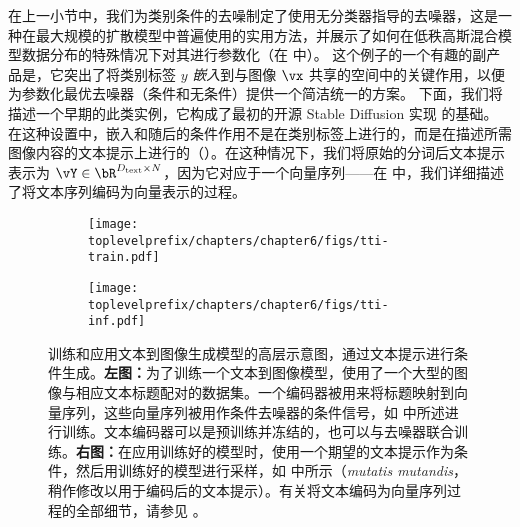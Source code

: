 \documentclass[../../book-main.tex]{subfiles}
\begin{document}
在上一小节中，我们为类别条件的去噪制定了使用无分类器指导的去噪器，这是一种在最大规模的扩散模型中普遍使用的实用方法，并展示了如何在低秩高斯混合模型数据分布的特殊情况下对其进行参数化（在  中）。
这个例子的一个有趣的副产品是，它突出了将类别标签 $y$ \textit{嵌入}到与图像 $\vx$ 共享的空间中的关键作用，以便为参数化最优去噪器（条件和无条件）提供一个简洁统一的方案。
下面，我们将描述一个早期的此类实例，它构成了最初的开源 Stable Diffusion 实现 \cite{rombach2022high} 的基础。
在这种设置中，嵌入和随后的条件作用不是在类别标签上进行的，而是在描述所需图像内容的文本提示上进行的（）。在这种情况下，我们将原始的分词后文本提示表示为 $\vY \in \bR^{D_{\mathrm{text}} \times N}$，因为它对应于一个向量序列——在  中，我们详细描述了将文本序列编码为向量表示的过程。

\begin{figure}[tbp]
  \centering
  \begin{subfigure}{0.47\textwidth}
    \texttt{[image: \\toplevelprefix/chapters/chapter6/figs/tti-train.pdf]}
    \caption{}
  \end{subfigure}
  \hfill
  \begin{subfigure}{0.47\textwidth}
    \texttt{[image: \\toplevelprefix/chapters/chapter6/figs/tti-inf.pdf]}
    \caption{}
  \end{subfigure}

  \caption{训练和应用文本到图像生成模型的高层示意图，通过文本提示进行条件生成。\textbf{左图：}为了训练一个文本到图像模型，使用了一个大型的图像与相应文本标题配对的数据集。一个编码器被用来将标题映射到向量序列，这些向量序列被用作条件去噪器的条件信号，如  中所述进行训练。文本编码器可以是预训练并冻结的，也可以与去噪器联合训练。\textbf{右图：}在应用训练好的模型时，使用一个期望的文本提示作为条件，然后用训练好的模型进行采样，如  中所示（\textit{mutatis mutandis}，稍作修改以用于编码后的文本提示）。有关将文本编码为向量序列过程的全部细节，请参见 。}
  \label{fig:text-to-image}
\end{figure}
\end{document}
